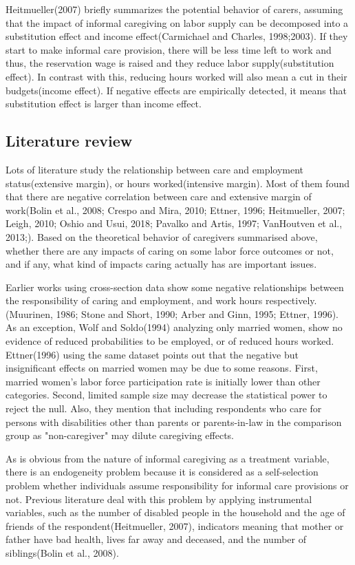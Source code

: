 \documentclass{article}
\theoremstyle{definition}
\begin{document}
Heitmueller(2007) briefly summarizes the potential behavior of carers, assuming that the impact of informal caregiving on labor supply can be decomposed into a substitution effect and income effect(Carmichael and Charles, 1998;2003). If they start to make informal care provision, there will be less time left to work and thus, the reservation wage is raised and they reduce labor supply(substitution effect). In contrast with this, reducing hours worked will also mean a cut in their budgets(income effect). If negative effects are empirically detected, it means that substitution effect is larger than income effect.

\subsection{Literature review}

Lots of literature study the relationship between care and employment status(extensive margin), or hours worked(intensive margin). Most of them found that there are negative correlation between care and extensive margin of work(Bolin et al., 2008; Crespo and Mira, 2010; Ettner, 1996; Heitmueller, 2007; Leigh, 2010; Oshio and Usui, 2018; Pavalko and Artis, 1997; VanHoutven et al., 2013;). Based on the theoretical behavior of caregivers summarised above, whether there are any impacts of caring on some labor force outcomes or not, and if any, what kind of impacts caring actually has are important issues. 

Earlier works using cross-section data show some negative relationships between the responsibility of caring and employment, and work hours respectively.(Muurinen, 1986; Stone and Short, 1990; Arber and Ginn, 1995; Ettner, 1996). As an exception, Wolf and Soldo(1994) analyzing only married women, show no evidence of reduced probabilities to be employed, or of reduced hours worked. Ettner(1996) using the same dataset points out that the negative but insignificant effects on married women may be due to some reasons. First, married women's labor force participation rate is initially lower than other categories. Second, limited sample size may decrease the statistical power to reject the null. Also, they mention that including respondents who care for persons with disabilities other than parents or parents-in-law in the comparison group as "non-caregiver" may dilute caregiving effects.

As is obvious from the nature of informal caregiving as a treatment variable, there is an endogeneity problem because it is considered as a self-selection problem whether individuals assume responsibility for informal care provisions or not. Previous literature deal with this problem by applying instrumental variables, such as the number of disabled people in the household and the age of friends of the respondent(Heitmueller, 2007), indicators meaning that mother or father have bad health, lives far away and deceased, and the number of siblings(Bolin et al., 2008). 
\end{document}
